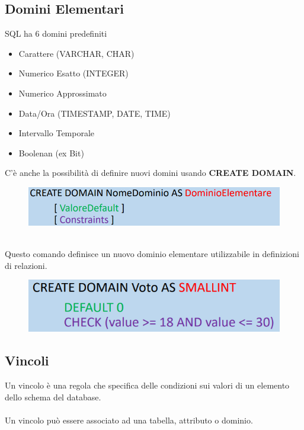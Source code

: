 \documentclass[12pt, a4paper]{article}
\begin{document}
    \subsection*{Domini Elementari}
    SQL ha 6 domini predefiniti
    \begin{itemize}
        \item Carattere (VARCHAR, CHAR)
        \item Numerico Esatto (INTEGER)
        \item Numerico Approssimato
        \item Data/Ora (TIMESTAMP, DATE, TIME)
        \item Intervallo Temporale
        \item Boolenan (ex Bit)
    \end{itemize}
    C'è anche la possibilità di definire nuovi domini usando \textbf{CREATE DOMAIN}.
    \begin{figure}[htbp]
        \centering
        \includegraphics[scale=0.5]{createdomain.png}
    \end{figure} 
    \\Questo comando definisce un nuovo dominio elementare utilizzabile in definizioni di relazioni.
    \begin{figure}[htbp]
        \centering
        \includegraphics[scale=0.5]{createvoto2.png}
    \end{figure}

    \subsection*{Vincoli}
    Un vincolo è una regola che specifica delle condizioni sui valori di un elemento
    dello schema del database.
    \\\\Un vincolo può essere associato ad una tabella, attributo o dominio.
\end{document}
